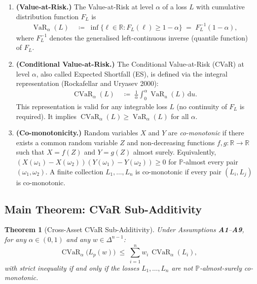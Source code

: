\documentclass[12pt,openany]{book}
\newcommand{\Prob}{\mathbb{P}}
\newcommand{\bfw}{\mathbf{w}}
\DeclareMathOperator{\CVaR}{CVaR}
\DeclareMathOperator{\VaR}{VaR}
\numberwithin{equation}{chapter}
\theoremstyle{plain}
\newtheorem{theorem}{Theorem}[chapter]
\theoremstyle{definition}
\theoremstyle{remark}
\def\bfw{w}%
\begin{document}
\begin{enumerate}[label=\textbf{A\arabic*.}, leftmargin=*, widest=A9]
  \item \textbf{(Value-at-Risk.)}
        The Value-at-Risk at level $\alpha$ of a loss $L$ with
        cumulative distribution function $F_L$ is
        \begin{align}
          \VaR_\alpha(L)
          &\;\coloneqq\;
          \inf\bigl\{ \ell \in \mathbb{R} :
            F_L(\ell) \geq 1 - \alpha \bigr\}
          \;=\; F_L^{-1}(1-\alpha),
          \label{eq:var-def}
        \end{align}
        where $F_L^{-1}$ denotes the generalised left-continuous
        inverse (quantile function) of $F_L$.

  \item \textbf{(Conditional Value-at-Risk.)}
        The Conditional Value-at-Risk (CVaR) at level $\alpha$,
        also called Expected Shortfall (ES), is defined via the
        integral representation (Rockafellar and Uryasev 2000):
        \begin{align}
          \CVaR_\alpha(L)
          &\;\coloneqq\;
          \frac{1}{\alpha}
          \int_0^{\alpha} \VaR_u(L)\,\mathrm{d}u.
          \label{eq:cvar-integral-def}
        \end{align}
        This representation is valid for any integrable loss $L$
        (no continuity of $F_L$ is required).  It implies
        $\CVaR_\alpha(L) \geq \VaR_\alpha(L)$ for all $\alpha$.

  \item \textbf{(Co-monotonicity.)}
        Random variables $X$ and $Y$ are \emph{co-monotonic} if
        there exists a common random variable $Z$ and
        non-decreasing functions $f,g : \mathbb{R} \to \mathbb{R}$
        such that $X = f(Z)$ and $Y = g(Z)$ almost surely.
        Equivalently, $(X(\omega_1)-X(\omega_2))
        (Y(\omega_1)-Y(\omega_2)) \geq 0$ for $\Prob$-almost every
        pair $(\omega_1,\omega_2)$.  A finite collection
        $L_1,\ldots,L_n$ is co-monotonic if every pair
        $(L_i, L_j)$ is co-monotonic.

\end{enumerate}

\subsection{Main Theorem: CVaR Sub-Additivity}

\begin{theorem}[Cross-Asset CVaR Sub-Additivity]
\label{thm:cross-asset-cvar}
Under Assumptions \textbf{A1}--\textbf{A9}, for any
$\alpha \in (0,1)$ and any $\bfw \in \Delta^{n-1}$:
\begin{equation}
  \CVaR_\alpha\!\bigl(L_p(\bfw)\bigr)
  \;\leq\;
  \sum_{i=1}^n w_i\, \CVaR_\alpha(L_i),
  \label{eq:cvar-subadd}
\end{equation}
with strict inequality if and only if the losses
$L_1, \ldots, L_n$ are not $\Prob$-almost-surely co-monotonic.
\end{theorem}
\end{document}

